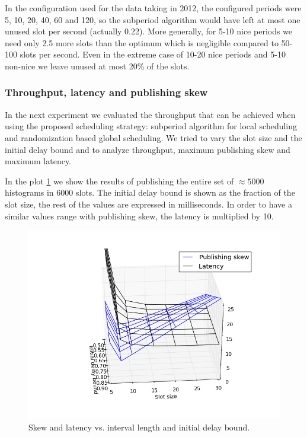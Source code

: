 In the configuration used for the data taking in 2012, the configured periods were 5, 10, 20, 40, 60 and 120, so the subperiod algorithm would have left at most one unused slot per second (actually 0.22). More generally, for 5-10 nice periods we need only 2.5 more slots than the optimum which is negligible compared to 50-100 slots per second. Even in the extreme case of 10-20 nice periods and 5-10 non-nice we leave unused at most 20\% of the slots.

\subsubsection*{Throughput, latency and publishing skew}

In the next experiment we evaluated the throughput that can be achieved when using the proposed scheduling strategy: subperiod algorithm for local scheduling and randomization based global scheduling. We tried to vary the slot size and the initial delay bound and to analyze throughput, maximum publishing skew and maximum latency. 

In the plot \ref{fig:skew_lat_sim} we show the results of publishing the entire set of $\approx 5000$ histograms in $6000$ slots. The initial delay bound is shown as the fraction of the slot size, the rest of the values are expressed in milliseconds. In order to have a similar values range with publishing skew, the latency is multiplied by 10.

\begin{figure}[ht]
\centering
\includegraphics[scale=0.7]{Images/skew_lat_sim.png}
\caption{Skew and latency vs. interval length and initial delay bound.}
\label{fig:skew_lat_sim}
\end{figure}


